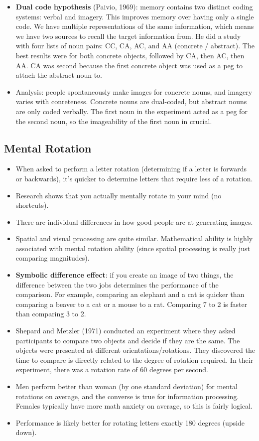 \documentclass[]{article}
\begin{document}
\begin{itemize}
				\item \textbf{Dual code hypothesis} (Paivio, 1969): memory contains two distinct coding systems: verbal and imagery. This improves memory over having only a single code. We have multiple representations of the same information, which means we have two sources to recall the target information from. He did a study with four lists of noun pairs: CC, CA, AC, and AA (concrete / abstract). The best results were for both concrete objects, followed by CA, then AC, then AA. CA was second because the first concrete object was used as a peg to attach the abstract noun to.
				\item Analysis: people spontaneously make images for concrete nouns, and imagery varies with conreteness. Concrete nouns are dual-coded, but abstract nouns are only coded verbally. The first noun in the experiment acted as a peg for the second noun, so the imageability of the first noun in crucial.
			\end{itemize}

		\subsection{Mental Rotation}
			\begin{itemize}
				\item When asked to perform a letter rotation (determining if a letter is forwards or backwards), it's quicker to determine letters that require less of a rotation.
				\item Research shows that you actually mentally rotate in your mind (no shortcuts).
				\item There are individual differences in how good people are at generating images.
				\item Spatial and visual processing are quite similar. Mathematical ability is highly associated with mental rotation ability (since spatial processing is really just comparing magnitudes).
				\item \textbf{Symbolic difference effect}: if you create an image of two things, the difference between the two jobs determines the performance of the comparison. For example, comparing an elephant and a cat is quicker than comparing a beaver to a cat or a mouse to a rat. Comparing 7 to 2 is faster than comparing 3 to 2.
				\item Shepard and Metzler (1971) conducted an experiment where they asked participants to compare two objects and decide if they are the same. The objects were presented at different orientations/rotations. They discovered the time to compare is directly related to the degree of rotation required. In their experiment, there was a rotation rate of 60 degrees per second.
				\item Men perform better than woman (by one standard deviation) for mental rotations on average, and the converse is true for information processing. Females typically have more math anxiety on average, so this is fairly logical. 
				\item Performance is likely better for rotating letters exactly 180 degrees (upside down).
			\end{itemize}
\end{document}
